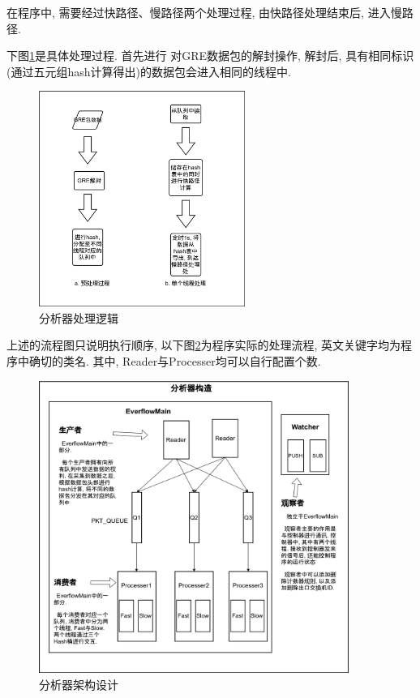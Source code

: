 在程序中, 需要经过快路径、慢路径两个处理过程, 由快路径处理结束后,
进入慢路径.

下图\ref{fig:analyzer_process}是具体处理过程. 首先进行
对GRE数据包的解封操作, 解封后,
具有相同标识(通过五元组hash计算得出)的数据包会进入相同的线程中.

\begin{figure}
  \centering
  \includegraphics[width=0.6\textwidth]{../img/analyze_process.png}
  \caption{分析器处理逻辑}
  \label{fig:analyzer_process}
\end{figure}

上述的流程图只说明执行顺序, 以下图\ref{fig:analyzer_arch}为程序实际的处理流程,
英文关键字均为程序中确切的类名. 其中, Reader与Processer均可以自行配置个数.

\begin{figure}
  \centering
  \includegraphics[width=0.9\textwidth]{../img/analyzer_structure.png}
  \caption{分析器架构设计}
  \label{fig:analyzer_arch}
\end{figure}


